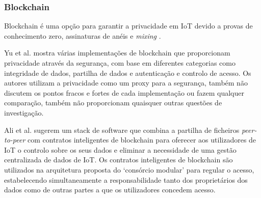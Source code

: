 \documentclass[conference]{IEEEtran}
\begin{document}
\subsubsection{Blockchain}

Blockchain é uma opção para garantir a privacidade em IoT devido a provas de
conhecimento zero, assinaturas de anéis e \textit{mixing} \cite{PrivacyblockchainWikipedia}.


Yu et al. \cite{yu2018blockchain} mostra várias implementações de blockchain
que proporcionam privacidade através da segurança, com base em diferentes
categorias como integridade de dados, partilha de dados e autenticação e controlo
de acesso. Os autores utilizam a privacidade como um proxy para a segurança,
também não discutem os pontos fracos e fortes de cada implementação ou fazem
qualquer comparação, também não proporcionam quaisquer outras questões de investigação.


Ali et al. \cite{AliIoT} sugerem um stack de software que combina a partilha
de ficheiros \textit{peer-to-peer} com contratos inteligentes de blockchain
para oferecer aos utilizadores de IoT o controlo sobre os seus dados e eliminar
a necessidade de uma gestão centralizada de dados de IoT. Os contratos inteligentes
de blockchain são utilizados na arquitetura proposta do `consórcio modular'
para regular o acesso, estabelecendo simultaneamente a responsabilidade tanto
dos proprietários dos dados como de outras partes a que os utilizadores concedem
acesso.

\end{document}
